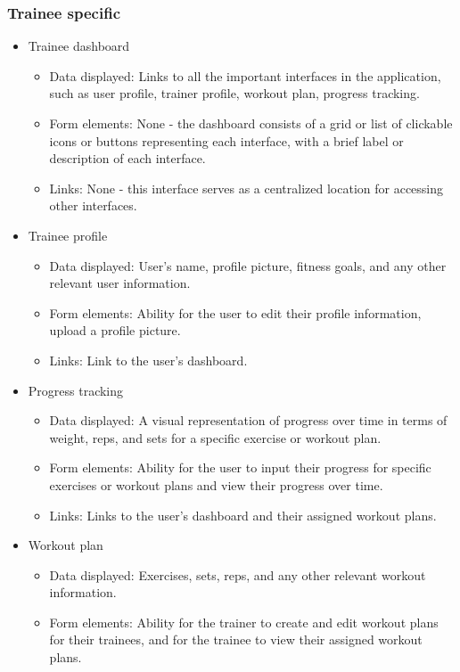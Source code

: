 \documentclass{article}
\begin{document}
\subsubsection*{Trainee specific}
\begin{itemize}
\item Trainee dashboard
    \begin{itemize}
        \item Data displayed: Links to all the important interfaces in the application, such as user profile, trainer profile, workout plan, progress tracking.
        \item Form elements: None - the dashboard consists of a grid or list of clickable icons or buttons representing each interface, with a brief label or description of each interface.
        \item Links: None - this interface serves as a centralized location for accessing other interfaces.
    \end{itemize}
\item Trainee profile
    \begin{itemize}
        \item Data displayed: User's name, profile picture, fitness goals, and any other relevant user information.
        \item Form elements: Ability for the user to edit their profile information, upload a profile picture.
        \item Links: Link to the user's dashboard.
    \end{itemize}
\item Progress tracking
    \begin{itemize}
        \item Data displayed: A visual representation of progress over time in terms of weight, reps, and sets for a specific exercise or workout plan.
        \item Form elements: Ability for the user to input their progress for specific exercises or workout plans and view their progress over time.
        \item Links: Links to the user's dashboard and their assigned workout plans.
    \end{itemize}
\item Workout plan
    \begin{itemize}
        \item Data displayed: Exercises, sets, reps, and any other relevant workout information.
        \item Form elements: Ability for the trainer to create and edit workout plans for their trainees, and for the trainee to view their assigned workout plans.

\end{itemize}
\end{itemize}
\end{document}
